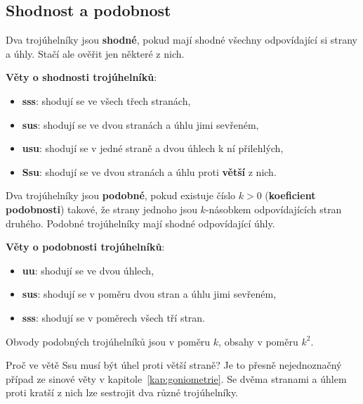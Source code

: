 \subsection{Shodnost a podobnost}\label{sec:shodnost-podobnost}

\begin{definitionbox}
  Dva trojúhelníky jsou \textbf{shodné}, pokud mají shodné všechny odpovídající si strany a úhly. Stačí ale ověřit jen některé z nich.

  \textbf{Věty o shodnosti trojúhelníků}:
  \begin{itemize}
    \item \textbf{sss}: shodují se ve všech třech stranách,
    \item \textbf{sus}: shodují se ve dvou stranách a úhlu jimi sevřeném,
    \item \textbf{usu}: shodují se v jedné straně a dvou úhlech k ní přilehlých,
    \item \textbf{Ssu}: shodují se ve dvou stranách a úhlu proti \textbf{větší} z nich.
  \end{itemize}

  Dva trojúhelníky jsou \textbf{podobné}, pokud existuje číslo $k > 0$ (\textbf{koeficient podobnosti}) takové, že strany jednoho jsou $k$-násobkem odpovídajících stran druhého. Podobné trojúhelníky mají shodné odpovídající úhly.

  \textbf{Věty o podobnosti trojúhelníků}:
  \begin{itemize}
    \item \textbf{uu}: shodují se ve dvou úhlech,
    \item \textbf{sus}: shodují se v poměru dvou stran a úhlu jimi sevřeném,
    \item \textbf{sss}: shodují se v poměrech všech tří stran.
  \end{itemize}
  Obvody podobných trojúhelníků jsou v poměru $k$, obsahy v poměru $k^2$.
\end{definitionbox}

Proč ve větě Ssu musí být úhel proti větší straně? Je to přesně nejednoznačný případ ze sinové věty v kapitole~\ref{kap:goniometrie}. Se dvěma stranami a úhlem proti kratší z nich lze sestrojit dva různé trojúhelníky.

